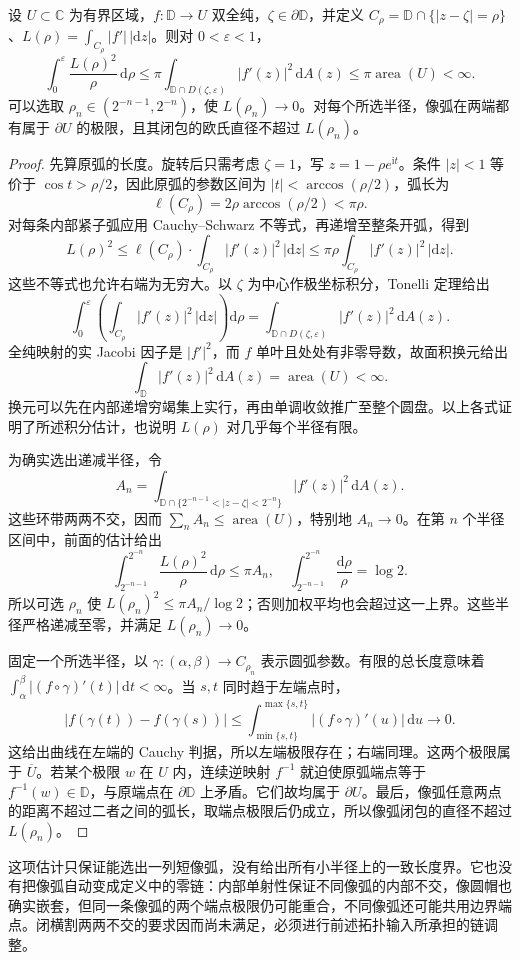 \begin{proposition}\label{b3:prop:07-short-image-arcs}
设 \(U\subset\mathbb C\) 为有界区域，\(f:\mathbb D\to U\) 双全纯，\(\zeta\in\partial\mathbb D\)，并定义 \(C_\rho=\mathbb D\cap\{|z-\zeta|=\rho\}\)、\(L(\rho)=\int_{C_\rho}|f'|\,|\mathrm dz|\)。则对 \(0<\varepsilon<1\)，
\[
 \int_0^\varepsilon\frac{L(\rho)^2}{\rho}\,\mathrm d\rho
 \le\pi\int_{\mathbb D\cap D(\zeta,\varepsilon)}|f'(z)|^2\,\mathrm dA(z)
 \le\pi\operatorname{area}(U)<\infty.
\]
可以选取 \(\rho_n\in(2^{-n-1},2^{-n})\)，使 \(L(\rho_n)\to0\)。对每个所选半径，像弧在两端都有属于 \(\partial U\) 的极限，且其闭包的欧氏直径不超过 \(L(\rho_n)\)。
\end{proposition}
\begin{proof}
先算原弧的长度。旋转后只需考虑 \(\zeta=1\)，写 \(z=1-\rho e^{\mathrm it}\)。条件 \(|z|<1\) 等价于 \(\cos t>\rho/2\)，因此原弧的参数区间为 \(|t|<\arccos(\rho/2)\)，弧长为
\[
 \ell(C_\rho)=2\rho\arccos(\rho/2)<\pi\rho.
\]
对每条内部紧子弧应用 Cauchy--Schwarz 不等式，再递增至整条开弧，得到
\[
 L(\rho)^2
 \le\ell(C_\rho)\cdot\int_{C_\rho}|f'(z)|^2\,|\mathrm dz|
 \le\pi\rho\int_{C_\rho}|f'(z)|^2\,|\mathrm dz|.
\]
这些不等式也允许右端为无穷大。以 \(\zeta\) 为中心作极坐标积分，Tonelli 定理给出
\[
 \int_0^\varepsilon
 \left(\int_{C_\rho}|f'(z)|^2\,|\mathrm dz|\right)\mathrm d\rho
 =\int_{\mathbb D\cap D(\zeta,\varepsilon)}|f'(z)|^2\,\mathrm dA(z).
\]
全纯映射的实 Jacobi 因子是 \(|f'|^2\)，而 \(f\) 单叶且处处有非零导数，故面积换元给出
\[
 \int_{\mathbb D}|f'(z)|^2\,\mathrm dA(z)
 =\operatorname{area}(U)<\infty.
\]
换元可以先在内部递增穷竭集上实行，再由单调收敛推广至整个圆盘。以上各式证明了所述积分估计，也说明 \(L(\rho)\) 对几乎每个半径有限。

为确实选出递减半径，令
\[
 A_n=\int_{\mathbb D\cap\{2^{-n-1}<|z-\zeta|<2^{-n}\}}
 |f'(z)|^2\,\mathrm dA(z).
\]
这些环带两两不交，因而 \(\sum_nA_n\le\operatorname{area}(U)\)，特别地 \(A_n\to0\)。在第 \(n\) 个半径区间中，前面的估计给出
\[
 \int_{2^{-n-1}}^{2^{-n}}\frac{L(\rho)^2}{\rho}\,\mathrm d\rho
 \le\pi A_n,
 \quad
 \int_{2^{-n-1}}^{2^{-n}}\frac{\mathrm d\rho}{\rho}=\log2.
\]
所以可选 \(\rho_n\) 使 \(L(\rho_n)^2\le\pi A_n/\log2\)；否则加权平均也会超过这一上界。这些半径严格递减至零，并满足 \(L(\rho_n)\to0\)。

固定一个所选半径，以 \(\gamma:(\alpha,\beta)\to C_{\rho_n}\) 表示圆弧参数。有限的总长度意味着 \(\int_\alpha^\beta|(f\circ\gamma)'(t)|\,\mathrm dt<\infty\)。当 \(s,t\) 同时趋于左端点时，
\[
 |f(\gamma(t))-f(\gamma(s))|
 \le\int_{\min\{s,t\}}^{\max\{s,t\}}
 |(f\circ\gamma)'(u)|\,\mathrm du\longrightarrow0.
\]
这给出曲线在左端的 Cauchy 判据，所以左端极限存在；右端同理。这两个极限属于 \(\overline U\)。若某个极限 \(w\) 在 \(U\) 内，连续逆映射 \(f^{-1}\) 就迫使原弧端点等于 \(f^{-1}(w)\in\mathbb D\)，与原端点在 \(\partial\mathbb D\) 上矛盾。它们故均属于 \(\partial U\)。最后，像弧任意两点的距离不超过二者之间的弧长，取端点极限后仍成立，所以像弧闭包的直径不超过 \(L(\rho_n)\)。
\end{proof}
这项估计只保证能选出一列短像弧，没有给出所有小半径上的一致长度界。它也没有把像弧自动变成定义中的零链：内部单射性保证不同像弧的内部不交，像圆帽也确实嵌套，但同一条像弧的两个端点极限仍可能重合，不同像弧还可能共用边界端点。闭横割两两不交的要求因而尚未满足，必须进行前述拓扑输入所承担的链调整。


